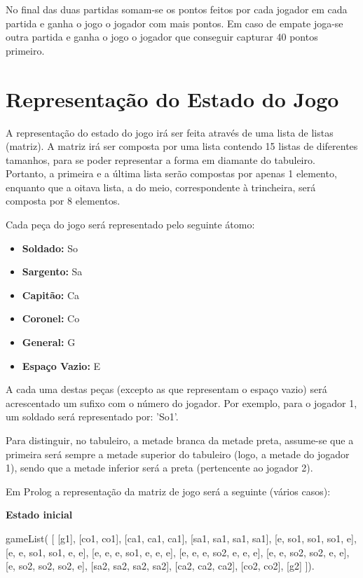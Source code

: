 No final das duas partidas somam-se os pontos feitos por cada jogador em cada partida e ganha o jogo o jogador com mais pontos. Em caso de empate joga-se outra partida e ganha o jogo o jogador que conseguir capturar 40 pontos primeiro.

\newpage


\section{Representação do Estado do Jogo}

A representação do estado do jogo irá ser feita através de uma lista de listas (matriz).
A matriz irá ser composta por uma lista contendo 15 listas de diferentes tamanhos, para se poder representar a forma em diamante do tabuleiro.
Portanto, a primeira e a última lista serão compostas por apenas 1 elemento, enquanto que a oitava lista, a do meio, correspondente à trincheira, será composta por 8 elementos.

Cada peça do jogo será representado pelo seguinte átomo:

\begin{itemize}
	\item{\textbf{Soldado:} So}
	\item {\textbf{Sargento:} Sa}
	\item{\textbf{Capitão:} Ca}
	\item{\textbf{Coronel:} Co}
	\item{\textbf{General:} G}
	\item{\textbf{Espaço Vazio:} E}
\end{itemize}

A cada uma destas peças (excepto as que representam o espaço vazio) será acrescentado um sufixo com o número do jogador.
Por exemplo, para o jogador 1, um soldado será representado por: 'So1'.

Para distinguir, no tabuleiro, a metade branca da metade preta, assume-se que a primeira
será sempre a metade superior do tabuleiro (logo, a metade do jogador 1),
sendo que a metade inferior será a preta (pertencente ao jogador 2).

Em Prolog a representação da matriz de jogo será a seguinte (vários casos):

\vspace{1cm}

\textbf{Estado inicial}

gameList( [ [g1],
		[co1, co1],
		[ca1, ca1, ca1],
		[sa1, sa1, sa1, sa1],
    [e, so1, so1, so1, e],
		[e, e, so1, so1, e, e],
		[e, e, e, so1, e, e, e],
    [e, e, e, so2, e, e, e],
		[e, e, so2, so2, e, e],
		[e, so2, so2, so2, e],
		[sa2, sa2, sa2, sa2],
    [ca2, ca2, ca2],
		[co2, co2],
 		[g2]  ]).

